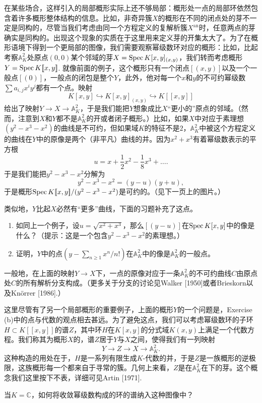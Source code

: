 在某些场合，这样引入的局部概形实际上还不够局部：概形处一点的局部环依然包含着许多概形整体结构的信息。比如，非奇异簇$X$的概形在不同的闭点处的芽不一定是同构的，尽管当我们考虑由同一个方程定义的复解析簇$X^{\text{an}}$时，任意两点的芽确实是同构的。出现这个现象的实质在于这里用来定义芽的开集太大了。为了在概形语境下得到一个更局部的图像，我们需要观察幂级数环对应的概形：比如，比起考察$\mathbb{A}_K^2$处原点$(0,0)$某个邻域的芽$X=\operatorname{Spec} K[x,y]_{(x,y)}$，我们转而考虑概形$Y=\operatorname{Spec} K [\![x,y]\!]$. 就像前面的例子，这个概形只有一个闭点$[(x,y)]$以及一个一般点$[(0)]$，一般点的闭包是整个$Y$，此外，他对每一个$x$和$y$的不可约幂级数$\sum a_{i,j}x^iy^j$都有一个点。映射
\[
	K[x,y]\hookrightarrow K[x,y]_{(x,y)}\hookrightarrow K[\![x,y]\!]
\]
给出了映射$Y\to X\to \mathbb{A}_K^2$，于是我们能把$Y$想象成比$X$“更小的”原点的邻域。（然而，注意到$X$和$Y$都不是$\mathbb{A}_K^2$的开或者闭子概形。）比如，如果$X$中对应于素理想$(y^2-x^3-x^2)$的曲线是不可约，但如果域$K$的特征不是$2$，$\mathbb{A}_K^2$中被这个方程定义的曲线在$Y$中的原像是两个（非平凡）曲线的并。因为$x^2+x^3$有着幂级数表示的平方根
\[
	u=x+\frac{1}{2}x^2-\frac{1}{8}x^3+\dots.
\]
于是我们能把$y^2-x^3-x^2$分解为
\[
	y^2-x^3-x^2=(y-u)(y+u),
\]
于是概形$\operatorname{Spec}  K[\![x,y]\!]/(y^2-x^3-x^2)$是可约的。（见下一页上的图片。）


类似地，$Y$比起$X$必然有“更多”曲线，下面的习题补充了这点。

\begin{exe}
	\begin{enumerate}[{(a)}]\setlength{\itemsep}{0pt}
		\item 如同上一个例子，设$u=\sqrt{x^2+x^3}$，那么$[(y-u)]$在$\operatorname{Spec} K[x,y]$中的像是什么？（提示：这是一个包含$y^2-x^3-x^2$的素理想。）
		\item 证明，$Y$中的点$(y-\sum_{n\geq 1}x^n/n!)$在$\mathbb{A}_K^2$中的像是$\mathbb{A}_K^2$的一般点。
	\end{enumerate}
\end{exe}

一般地，在上面的映射$Y\to X$下，一点的原像对应于一条$\mathbb{A}_K^2$的不可约曲线$C$由原点处$C$的所有解析分支构成。（更多关于分支的讨论见Walker [1950]或者Brieskorn以及Kn\"{o}rrer [1986].）

这里尽管有了另一个局部概形的重要例子，上面的概形$Y$的一个问题是，Exercise {\thethm}(b)中的点与代数的观点相去甚远。为了避免这点，我们可以考虑幂级数环的子环$H\subset K[\![x,y]\!]$的谱$Z$，其中环$H$在$K[x,y]$的分式域$K(x,y)$上满足一个代数方程。我们称其为概形$X$的，谱$Z$居于$Y$与$X$之间，使得我们有一列映射
\[
	Y\to Z\to X\to \mathbb{A}_K^2.
\]
这种构造的用处在于，$H$是一系列有限生成$K$-代数的并，于是$Z$是一族概形的逆极限，这族概形每一个都来自于寻常的簇。几何上来看，$Z$是在$\mathbb{A}_K^2$在下的芽。这个概念我们这里按下不表，详细可见Artin [1971].

\begin{exe}
	当$K=\mathbb{C}$，如何将收敛幂级数构成的环的谱纳入这种图像中？
\end{exe}